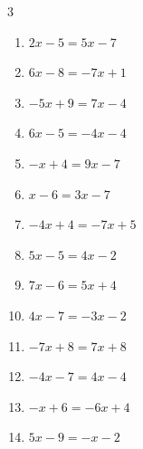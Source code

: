 \begin{multicols}{3}
\begin{enumerate}
  \item $2x-5=5x-7$


  \item $6x-8=-7x+1$


  \item $-5x+9=7x-4$


  \item $6x-5=-4x-4$


  \item $-x+4=9x-7$


  \item $x-6=3x-7$


  \item $-4x+4=-7x+5$


  \item $5x-5=4x-2$

        \phantom{$\displaystyle x=3$}

  \item $7x-6=5x+4$

        \phantom{$\displaystyle x=5$}

  \item $4x-7=-3x-2$


\columnbreak %

  \item $-7x+8=7x+8$

        \phantom{$\displaystyle x=0$}

  \item $-4x-7=4x-4$


  \item $-x+6=-6x+4$


  \item $5x-9=-x-2$


\end{enumerate}
\end{multicols}
